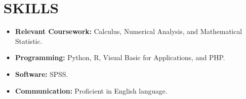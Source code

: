 \documentclass[a4paper,9pt]{extarticle}
\begin{document}
\section*{SKILLS}
\begin{itemize}
    \item \textbf{Relevant Coursework:} Calculus, Numerical Analysis, and Mathematical Statistic. %
    \item \textbf{Programming:} Python, R, Visual Basic for Applications, and PHP. %
    \item \textbf{Software:} SPSS. %
    \item \textbf{Communication:} Proficient in English language. %
\end{itemize}

\end{document}
